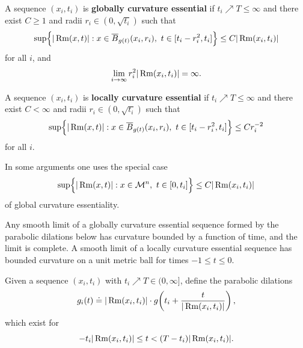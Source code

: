 \begin{definition}
\label{ch08-def-globally-curvature-essential}
A sequence \((x_i,t_i)\) is \textbf{globally curvature essential} if \(t_i\nearrow T\le\infty\) and there exist \(C\ge1\) and radii \(r_i\in(0,\sqrt{t_i})\) such that
\[
\sup\Bigl\{ |\operatorname{Rm}(x,t)| : x\in \overline B_{g(t)}(x_i,r_i),\ t\in[t_i-r_i^2,t_i]\Bigr\}
\le C |\operatorname{Rm}(x_i,t_i)|
\]
for all \(i\), and
\[
\lim_{i\to\infty} r_i^2 |\operatorname{Rm}(x_i,t_i)|=\infty.
\]
\end{definition}

\begin{definition}
\label{ch08-def-locally-curvature-essential}
A sequence \((x_i,t_i)\) is \textbf{locally curvature essential} if \(t_i\nearrow T\le\infty\) and there exist \(C<\infty\) and radii \(r_i\in(0,\sqrt{t_i})\) such that
\[
\sup\Bigl\{ |\operatorname{Rm}(x,t)| : x\in \overline B_{g(t)}(x_i,r_i),\ t\in[t_i-r_i^2,t_i]\Bigr\}
\le C r_i^{-2}
\]
for all \(i\).
\end{definition}

\begin{remark}
\label{ch08-rem-globally-essential-sequences}
In some arguments one uses the special case
\[
\sup\Bigl\{ |\operatorname{Rm}(x,t)| : x\in \mathcal M^n,\ t\in[0,t_i]\Bigr\}\le C|\operatorname{Rm}(x_i,t_i)|
\]
of global curvature essentiality.
\end{remark}

\begin{remark}
\label{ch08-rem-essentiality-consequences}
Any smooth limit of a globally curvature essential sequence formed by the parabolic dilations below has curvature bounded by a function of time, and the limit is complete. A smooth limit of a locally curvature essential sequence has bounded curvature on a unit metric ball for times \(-1\le t\le0\).
\end{remark}

\begin{definition}
\label{ch08-def-parabolic-dilations}
Given a sequence \((x_i,t_i)\) with \(t_i\nearrow T\in(0,\infty]\), define the parabolic dilations
\[
g_i(t)\doteq |\operatorname{Rm}(x_i,t_i)|\cdot g\!\left(t_i+\frac{t}{|\operatorname{Rm}(x_i,t_i)|}\right),
\]
which exist for
\[
-t_i|\operatorname{Rm}(x_i,t_i)|\le t < (T-t_i)|\operatorname{Rm}(x_i,t_i)|.
\]
\end{definition}

